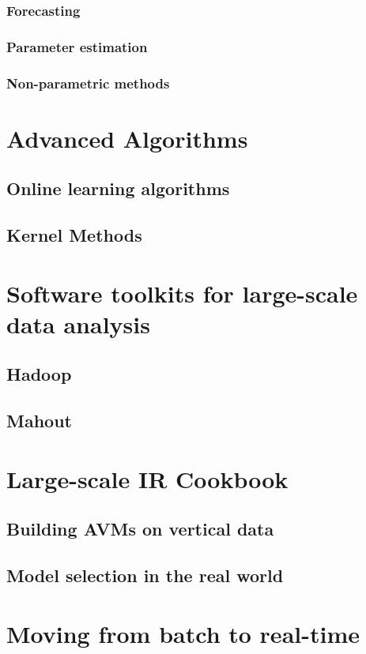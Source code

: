 \documentclass[]{book}    %
\begin{document}
\subsection{Forecasting}
\subsection{Parameter estimation}
\subsection{Non-parametric methods}

\chapter{Advanced Algorithms}
\section{Online learning algorithms}
\section{Kernel Methods}

\chapter{Software toolkits for large-scale data analysis}
\section{Hadoop}
\section{Mahout}

\chapter{Large-scale IR Cookbook}
\section{Building AVMs on vertical data}
\section{Model selection in the real world}

\chapter{Moving from batch to real-time}
\end{document}
